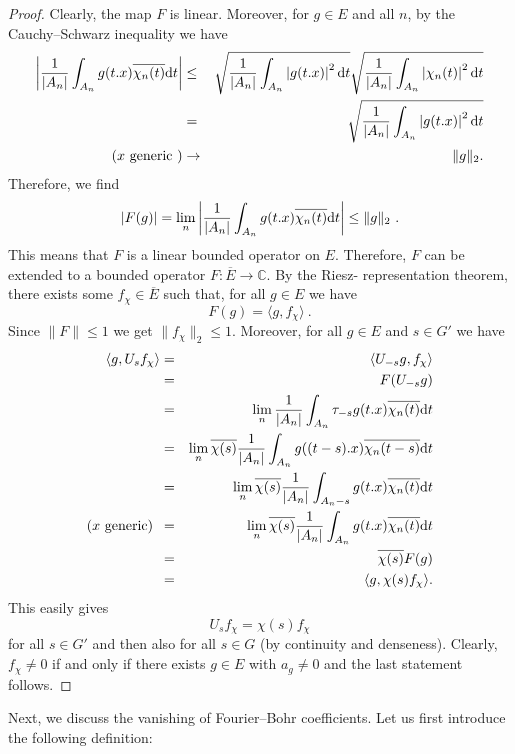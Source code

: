 \documentclass [14pt]{amsart}
\numberwithin{equation}{section}
\newcommand{\CC}{{\mathbb C}}
\newcommand{\dd}{\mbox{\rm d}}
\begin{document}
\begin{proof} Clearly, the map
 $F$ is  linear.  Moreover, for  $g \in E$ and all $n$, by the Cauchy--Schwarz inequality we have
\begin{eqnarray*}
 \left| \frac{1}{|A_n|} \int_{A_n} g(t.x) \overline{\chi_n(t)} \dd t \right| &\leq& \sqrt{ \frac{1}{|A_n|} \int_{A_n} \left|  g(t.x) \right|^2 \dd t} \sqrt{\frac{1}{|A_n|} \int_{A_n} \left|  \chi_n(t) \right|^2 \dd t} \\
  &= & \sqrt{ \frac{1}{|A_n|} \int_{A_n} \left|  g(t.x) \right|^2 \dd t}\\
(x  \mbox{ generic }) 	&\to & \|g\|_2.\\
\end{eqnarray*}
Therefore, we find
\[
|F(g)| =\lim_n \left| \frac{1}{|A_n|} \int_{A_n} g(t.x) \overline{\chi_n(t)} \dd t \right| \leq \|g\|_2 \ .
\]
This means that $F$ is a linear bounded operator on   $E$. Therefore, $F$ can be extended to a bounded operator $F : \overline{E} \to \CC$. By the Riesz- representation theorem, there exists some $f_\chi \in \overline{E}$ such that, for all $g \in E$ we have
\[
F(g)= \langle g, f_\chi \rangle \ .
\]
Since $\|F \|\leq 1$ we get  $\|f_\chi \|_2 \leq 1$.
Moreover,  for all $g \in E$ and $s \in G'$ we have
\begin{eqnarray*}
\langle g, U_{s} f_\chi\rangle &=& \langle U_{-s} g, f_\chi\rangle\\
&=&  F(U_{-s} g)\\
 &=&  \lim_n \frac{1}{|A_n|} \int_{A_n} \tau_{-s} g(t.x) \overline{\chi_n(t)} \dd t\\
&=&  \lim_n \overline{\chi (s)} \frac{1}{|A_n|} \int_{A_n} g((t-s).x) \overline{\chi_n (t-s)} \dd t \\
&=& \lim_n \overline{\chi (s)} \frac{1}{|A_n  |} \int_{A_n-s} g(t.x) \overline{\chi_n (t)} \dd t\\
(\mbox{$x$ generic})\;\: &=& \lim_n \overline{\chi (s)} \frac{1}{|A_n |} \int_{A_n} g(t.x) \overline{\chi_n (t)} \dd t\\
 &=& \overline{\chi(s)}  F(g)\\
&=& \langle g, \chi(s) f_\chi\rangle.
\end{eqnarray*}
This easily gives
$$U_s f_\chi = \chi(s) f_\chi$$
for all $s\in G'$ and then also for all $s\in G$ (by continuity and denseness). Clearly, $f_\chi \neq 0$ if and only if there exists $g\in E$ with $a_g \neq 0$ and the last statement follows.
\end{proof}


\medskip
Next, we discuss the vanishing of Fourier--Bohr coefficients. Let us first introduce the following definition:
\end{document}
